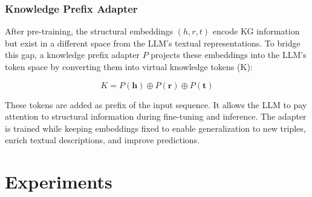 \documentclass[12pt,a4paper]{article}
\begin{document}
\subsubsection{Knowledge Prefix Adapter}
After pre-training, the structural embeddings \((h, r, t)\) encode
KG information but exist in a different space from the LLM's textual
representations. To bridge this gap, a knowledge prefix adapter \(P\)
projects these embeddings into the LLM's token space by converting
them into virtual knowledge tokens (K):

\begin{equation}
    K = P(\mathbf{h}) \oplus P(\mathbf{r}) \oplus P(\mathbf{t})
\end{equation}

These tokens are added as prefix of the input sequence. It allows
the LLM to pay attention to structural information during fine-tuning
and inference. The adapter is trained while keeping embeddings
fixed to enable generalization to new triples, enrich textual
descriptions, and improve predictions.
%
%


\section{Experiments}\label{sec:experiments}
\end{document}
